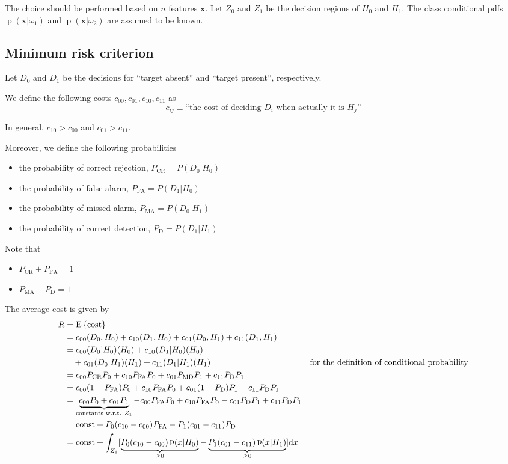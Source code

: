 \documentclass[oneside,onecolumn]{report}
\newcommand{\E}[1]{\text{E} \left\{ #1 \right\}}
\DeclareMathOperator*{\pdf}{p}
\let\P\relax
\DeclareMathOperator*{\P}{P}
\begin{document}
The choice should be performed based on $n$ features $\bm x$.
Let $Z_0$ and $Z_1$ be the decision regions of $H_0$ and $H_1$.
The class conditional pdfs $\pdf(\bm x | \omega_1)$ and $\pdf(\bm x | \omega_2)$ are assumed to be known.

\subsection{Minimum risk criterion}
Let $D_0$ and $D_1$ be the decisions for ``target absent'' and ``target present'', respectively.

We define the following costs $c_{00}, c_{01}, c_{10}, c_{11}$ as
$$ c_{i j} \equiv \text{``the cost of deciding } D_i \text{ when actually it is } H_j \text{''} $$

In general, $c_{10} > c_{00}$ and $c_{01} > c_{11}$.

Moreover, we define the following probabilities
\begin{itemize}
    \item the probability of correct rejection, $P_\text{CR} = P(D_0 | H_0)$
    \item the probability of false alarm, $P_\text{FA} = P(D_1 | H_0)$
    \item the probability of missed alarm, $P_\text{MA} = P(D_0 | H_1)$
    \item the probability of correct detection, $P_\text{D} = P(D_1 | H_1)$
\end{itemize}

Note that
\begin{itemize}
    \item $P_\text{CR} + P_\text{FA} = 1$
    \item $P_\text{MA} + P_\text{D} = 1$
\end{itemize}

The average cost is given by
\begin{align*}
    R
    &= \E{\text{cost}} \\
    &= c_{00} \P(D_0, H_0) + c_{10} \P(D_1, H_0) + c_{01} \P(D_0, H_1) + c_{11} \P(D_1, H_1) \\
    &= c_{00} \P(D_0 | H_0) \P(H_0) + c_{10} \P(D_1 | H_0) \P(H_0) \\
    &\quad + c_{01} \P(D_0 | H_1) \P(H_1) + c_{11} \P(D_1 | H_1) \P(H_1) & \text{for the definition of conditional probability} \\
    &= c_{00} P_\text{CR} P_0 + c_{10} P_\text{FA} P_0 + c_{01} P_\text{MD} P_1 + c_{11} P_\text{D} P_1 \\
    &= c_{00} (1 - P_\text{FA}) P_0 + c_{10} P_\text{FA} P_0 + c_{01} (1 - P_\text{D}) P_1 + c_{11} P_\text{D} P_1 \\
    &= \underbrace{c_{00} P_0 + c_{01} P_1}_\text{constants w.r.t. $Z_1$} - c_{00} P_\text{FA} P_0 + c_{10} P_\text{FA} P_0 - c_{01} P_\text{D} P_1 + c_{11} P_\text{D} P_1 \\
    &= \text{const} + P_0 (c_{10} - c_{00}) P_\text{FA} - P_1 (c_{01} - c_{11}) P_\text{D} \\
    &= \text{const} + \int_{Z_1} [ \underbrace{P_0 (c_{10} - c_{00}) \pdf(x | H_0)}_{\geq 0} - \underbrace{P_1 (c_{01} - c_{11}) \pdf(x | H_1)}_{\geq 0} ] \dd x
\end{align*}
\end{document}
